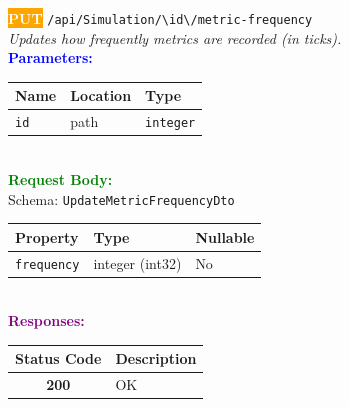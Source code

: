 \begin{tcolorbox}[
    colback=orange!5,
    colframe=orange,
    arc=2mm,
    boxrule=1pt,
    left=5pt,
    right=5pt,
    top=5pt,
    bottom=5pt
]
\noindent\colorbox{orange}{\textcolor{white}{\textbf{PUT}}} 
\texttt{\large /api/Simulation/\textbackslash{}{id\textbackslash{}}/metric-frequency}\\[0.3em]
\textit{Updates how frequently metrics are recorded (in ticks).}\\[0.3em]
\vspace{0.3em}
\textbf{\textcolor{blue}{Parameters:}}\\[0.2em]
\begin{tabular}{|l|l|l|}
\hline
\rowcolor{gray!20}
\textbf{Name} & \textbf{Location} & \textbf{Type} \\ \hline
\texttt{id} & path & \texttt{integer} \\ \hline
\end{tabular}\\[0.5em]
\vspace{0.3em}
\textbf{\textcolor{green}{Request Body:}}\\[0.2em]
Schema: \texttt{UpdateMetricFrequencyDto}\\[0.3em]
\begin{tabular}{|l|l|l|}
\hline
\rowcolor{green!10}
\textbf{Property} & \textbf{Type} & \textbf{Nullable} \\ \hline
\texttt{frequency} & integer (int32) & No \\ \hline
\end{tabular}\\[0.5em]
\vspace{0.3em}
\textbf{\textcolor{purple}{Responses:}}\\[0.2em]
\begin{tabular}{|c|p{10cm}|}
\hline
\rowcolor{gray!20}
\textbf{Status Code} & \textbf{Description} \\ \hline
\colorbox{green!20}{\textbf{200}} & OK \\ \hline
\end{tabular}
\end{tcolorbox}
\vspace{0.5em}

